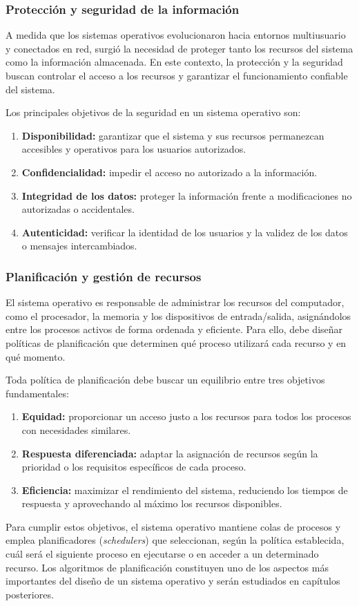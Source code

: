 \subsubsection{Protección y seguridad de la información}

A medida que los sistemas operativos evolucionaron hacia entornos multiusuario y conectados en red, surgió la necesidad de proteger tanto los recursos del sistema como la información almacenada. En este contexto, la protección y la seguridad buscan controlar el acceso a los recursos y garantizar el funcionamiento confiable del sistema.

Los principales objetivos de la seguridad en un sistema operativo son:
\begin{enumerate}
  \item \textbf{Disponibilidad:} garantizar que el sistema y sus recursos permanezcan accesibles y operativos para los usuarios autorizados.
  \item \textbf{Confidencialidad:} impedir el acceso no autorizado a la información.
  \item \textbf{Integridad de los datos:} proteger la información frente a modificaciones no autorizadas o accidentales.
  \item \textbf{Autenticidad:} verificar la identidad de los usuarios y la validez de los datos o mensajes intercambiados.
\end{enumerate}

\subsubsection{Planificación y gestión de recursos}

El sistema operativo es responsable de administrar los recursos del computador, como el procesador, la memoria y los dispositivos de entrada/salida, asignándolos entre los procesos activos de forma ordenada y eficiente. Para ello, debe diseñar políticas de planificación que determinen qué proceso utilizará cada recurso y en qué momento.

Toda política de planificación debe buscar un equilibrio entre tres objetivos fundamentales:
\begin{enumerate}
  \item \textbf{Equidad:} proporcionar un acceso justo a los recursos para todos los procesos con necesidades similares.
  \item \textbf{Respuesta diferenciada:} adaptar la asignación de recursos según la prioridad o los requisitos específicos de cada proceso.
  \item \textbf{Eficiencia:} maximizar el rendimiento del sistema, reduciendo los tiempos de respuesta y aprovechando al máximo los recursos disponibles.
\end{enumerate}

Para cumplir estos objetivos, el sistema operativo mantiene colas de procesos y emplea planificadores (\emph{schedulers}) que seleccionan, según la política establecida, cuál será el siguiente proceso en ejecutarse o en acceder a un determinado recurso. Los algoritmos de planificación constituyen uno de los aspectos más importantes del diseño de un sistema operativo y serán estudiados en capítulos posteriores.

